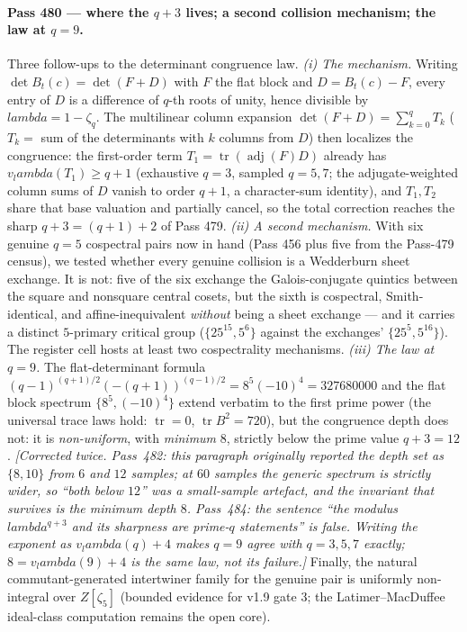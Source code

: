 \documentclass[12pt,a4paper]{article}
\def\mathbb#1{#1}%
\def\textbf#1{#1}%
\def\lambda{lambda}%
\theoremstyle{definition}
\newcommand{\ZZ}{\mathbb{Z}}
\begin{document}
\paragraph{Pass 480 --- where the $q{+}3$ lives; a second collision mechanism;
the law at $q=9$.}
Three follow-ups to the determinant congruence law.  \emph{(i) The mechanism.}
Writing $\det B_t(c)=\det(F+D)$ with $F$ the flat block and $D=B_t(c)-F$, every
entry of $D$ is a difference of $q$-th roots of unity, hence divisible by
$\lambda=1-\zeta_q$.  The multilinear column expansion
$\det(F+D)=\sum_{k=0}^{q}T_k$ ($T_k=$ sum of the determinants with $k$ columns
from $D$) then localizes the congruence: the first-order term
$T_1=\operatorname{tr}(\operatorname{adj}(F)D)$ already has
$v_\lambda(T_1)\ge q{+}1$ (exhaustive $q=3$, sampled $q=5,7$; the
adjugate-weighted column sums of $D$ vanish to order $q{+}1$, a character-sum
identity), and $T_1,T_2$ share that base valuation and partially cancel, so the
total correction reaches the sharp $q{+}3=(q{+}1)+2$ of Pass 479.
\emph{(ii) A second mechanism.}  With six genuine $q=5$ cospectral pairs now in
hand (Pass 456 plus five from the Pass-479 census), we tested whether every
genuine collision is a Wedderburn sheet exchange.  \textbf{It is not}: five of
the six exchange the Galois-conjugate quintics between the square and nonsquare
central cosets, but the sixth is cospectral, Smith-identical, and
affine-inequivalent \emph{without} being a sheet exchange --- and it carries a
distinct $5$-primary critical group ($\{25^{15},5^{6}\}$ against the exchanges'
$\{25^{5},5^{16}\}$).  The register cell hosts at least two cospectrality
mechanisms.  \emph{(iii) The law at $q=9$.}  The flat-determinant formula
$(q{-}1)^{(q+1)/2}(-(q{+}1))^{(q-1)/2}=8^5(-10)^4=327680000$ and the flat block
spectrum $\{8^5,(-10)^4\}$ extend verbatim to the first prime power (the
universal trace laws hold: $\operatorname{tr}=0$, $\operatorname{tr}B^2=720$),
but the congruence depth does not: it is \emph{non-uniform}, with
\emph{minimum} $8$, strictly below the prime value $q{+}3=12$.  \emph{[Corrected
twice.  Pass~482: this paragraph originally reported the depth set as
$\{8,10\}$ from $6$ and $12$ samples; at $60$ samples the generic spectrum is
strictly wider, so ``both below $12$'' was a small-sample artefact, and the
invariant that survives is the \emph{minimum} depth $8$.  Pass~484: the
sentence ``the modulus $\lambda^{q+3}$ and its sharpness are prime-$q$
statements'' is \emph{false}.  Writing the exponent as $v_\lambda(q)+4$ makes
$q=9$ agree with $q=3,5,7$ exactly; $8=v_\lambda(9)+4$ is the same law, not its
failure.]}  Finally, the natural commutant-generated
intertwiner family for the genuine pair is uniformly non-integral over
$\ZZ[\zeta_5]$ (bounded evidence for v1.9 gate 3; the
Latimer--MacDuffee ideal-class computation remains the open core).
\end{document}
